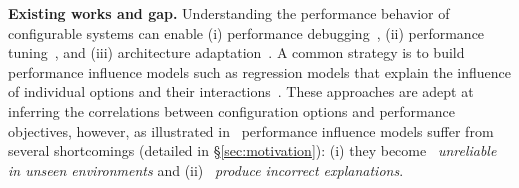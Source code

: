 \noindent\textbf{Existing works and gap.} Understanding the performance behavior of configurable systems can enable (i) performance debugging~\cite{SGAK:ESECFSE15,GSKA:SPPEXA}, (ii) performance tuning~\cite{H:CACM,SHM:LIO,H:AS,VPGFC:ICPE17,HPHL:ICSE15,WWHJK:GECCO15,NMSA:Arxive17,MARC:SPLC13,ORGC:SPLC14}, and (iii) architecture adaptation~\cite{JGAP:CSMR13,ABDD:VISSOFT13,KK:WSR16,JVKSK:SEAMS17,HSCMAR:SIGPLAN,FHM:FSE15,EEM:TSE,EEM:FSE10}. 
A common strategy is to build performance influence models such as regression models that explain the influence of individual options and their interactions~\cite{SGAK:ESECFSE15,VPGFC:ICPE17,GCASW:ASE13,pereira2019learning}. These approaches are adept at inferring the correlations between configuration options and performance objectives, however, as illustrated in~ performance influence models suffer from several shortcomings (detailed in \S\ref{sec:motivation}): (i) they become ~\emph{unreliable in unseen environments} and (ii) ~\emph{produce incorrect explanations}.



